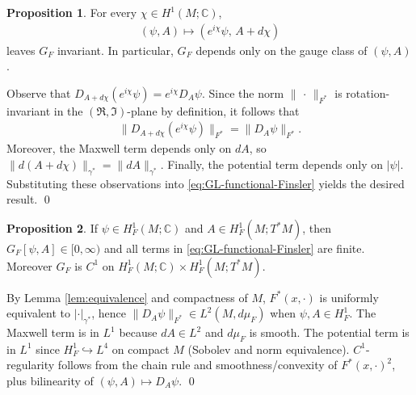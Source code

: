 \documentclass[fleqn,11pt,twoside]{article}
\makeatletter
\renewenvironment{proof}[1][\proofname]{\par
  \normalfont
  \topsep6\p@\@plus6\p@ \trivlist
  \item[\hskip\labelsep\textbf{%
    #1\@addpunct{.}}]\ignorespaces
}{%
  \qed\endtrivlist
}
\theoremstyle{definition}
\newtheorem{proposition}{Proposition}
\makeatother
\begin{document}
\begin{proposition}\label{prop:gauge-invariance}
For every $\chi\in H^1(M;\mathbb{C})$,
\begin{align*}
(\psi,A)\mapsto (e^{i\chi}\psi,\, A + d\chi)
\end{align*}
leaves $G_F$ invariant. In particular, $G_F$ depends only on the gauge class of $(\psi,A)$.
\end{proposition}

\begin{proof}
Observe that $D_{A+d\chi}(e^{i\chi}\psi) = e^{i\chi} D_A\psi$.  
Since the norm $\|\,\cdot\,\|_{F^*}$ is rotation-invariant in the $(\Re,\Im)$-plane by definition, it follows that  
\begin{align*}
\|D_{A+d\chi}(e^{i\chi}\psi)\|_{F^*} = \|D_A\psi\|_{F^*}.
\end{align*}
Moreover, the Maxwell term depends only on $dA$, so $\|d(A+d\chi)\|_{\gamma^*} = \|dA\|_{\gamma^*}$.  
Finally, the potential term depends only on $|\psi|$.  
Substituting these observations into \eqref{eq:GL-functional-Finsler} yields the desired result.
\end{proof}


\begin{proposition}\label{prop:welldef}
If $\psi\in H^1_F(M;\mathbb{C})$ and $A\in H^1_F(M;T^*M)$, then $G_F[\psi,A]\in[0,\infty)$
and all terms in \eqref{eq:GL-functional-Finsler} are finite. Moreover $G_F$ is $C^1$ on $H^1_F(M;\mathbb{C})\times H^1_F(M;T^*M)$.
\end{proposition}

\begin{proof}
By Lemma \ref{lem:equivalence} and compactness of $M$,
$F^*(x,\cdot)$ is uniformly equivalent to $|\cdot|_{\gamma^*}$, hence $\|D_A\psi\|_{F^*}\in L^2(M,d\mu_F)$ when $\psi,A\in H^1_F$. The Maxwell term is in $L^1$ because $dA\in L^2$ and $d\mu_F$ is smooth. The potential term is in $L^1$
since $H^1_F\hookrightarrow L^4$ on compact $M$ (Sobolev and norm equivalence). $C^1$-regularity follows from the chain rule and smoothness/convexity of $F^*(x,\cdot)^2$,
plus bilinearity of $(\psi,A)\mapsto D_A\psi$.
\end{proof}

\end{document}
